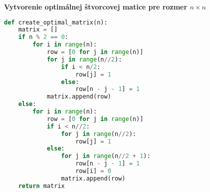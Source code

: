 \textbf{Vytvorenie optimálnej štvorcovej matice pre rozmer $n \times n$}

\begin{lstlisting}[language=Python, basicstyle=\footnotesize]
def create_optimal_matrix(n):
    matrix = []
    if n % 2 == 0:
        for i in range(n):
            row = [0 for j in range(n)]
            for j in range(n//2):
                if i < n/2:
                    row[j] = 1
                else:
                    row[n - j - 1] = 1
            matrix.append(row)
    else:
        for i in range(n):
            row = [0 for j in range(n)]
            if i < n//2:
                for j in range(n//2):
                    row[j] = 1
            else:
                for j in range(n//2 + 1):
                    row[n - j - 1] = 1
                    row[i] = 0
                matrix.append(row)
    return matrix
\end{lstlisting}